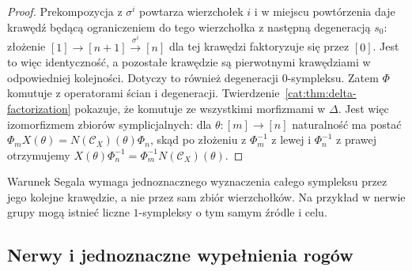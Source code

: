 \begin{proof}
Prekompozycja z $\sigma^i$ powtarza wierzchołek $i$ i w miejscu powtórzenia daje krawędź będącą ograniczeniem do tego wierzchołka z następną degeneracją $s_0$: złożenie $[1]\to[n+1]\xrightarrow{\sigma^i}[n]$ dla tej krawędzi faktoryzuje się przez $[0]$. Jest to więc identyczność, a pozostałe krawędzie są pierwotnymi krawędziami w odpowiedniej kolejności. Dotyczy to również degeneracji $0$-sympleksu. Zatem $\Phi$ komutuje z operatorami ścian i degeneracji. Twierdzenie~\ref{cat:thm:delta-factorization} pokazuje, że komutuje ze wszystkimi morfizmami w $\Delta$. Jest więc izomorfizmem zbiorów symplicjalnych: dla $\theta:[m]\to[n]$ naturalność ma postać $\Phi_m X(\theta)=N(\mathcal C_X)(\theta)\Phi_n$, skąd po złożeniu z $\Phi_m^{-1}$ z lewej i $\Phi_n^{-1}$ z prawej otrzymujemy $X(\theta)\Phi_n^{-1}=\Phi_m^{-1}N(\mathcal C_X)(\theta)$.
\end{proof}

Warunek Segala wymaga jednoznacznego wyznaczenia całego sympleksu przez jego kolejne krawędzie, a nie przez sam zbiór wierzchołków. Na przykład w nerwie grupy mogą istnieć liczne $1$-sympleksy o tym samym źródle i celu.


\subsection{Nerwy i jednoznaczne wypełnienia rogów}

